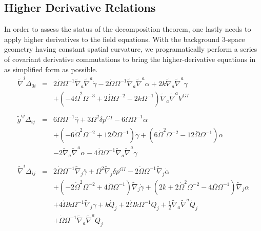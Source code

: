 \subsection{Higher Derivative Relations}
In order to assess the status of the decomposition theorem, one lastly needs to apply higher derivatives to the field equations. With the background 3-space geometry having constant spatial curvature, we programatically perform a series of covariant derivative commutations to bring the higher-derivative equations in as simplified form as possible.
\begin{eqnarray}
\tilde\nabla^i\Delta_{0i}&=& 2 \dot{\Omega} \Omega^{-1} \tilde{\nabla}_{a}\tilde{\nabla}^{a}\dot{\gamma} - 2 \dot{\Omega} \Omega^{-1} \tilde{\nabla}_{a}\tilde{\nabla}^{a}\alpha + 2 k \tilde{\nabla}_{a}\tilde{\nabla}^{a}\gamma 
\nonumber\\
&&+(-4 \dot{\Omega}^2 \Omega^{-3} + 2 \overset{..}{\Omega} \Omega^{-2} - 2 k \Omega^{-1}) \tilde{\nabla}_{a}\tilde{\nabla}^{a}V^{GI}{}
\\  \nonumber\\ 
\tilde g^{ij}\Delta_{ij}&=& 6 \dot{\Omega} \Omega^{-1} \overset{..}{\gamma} + 3 \Omega^2 \delta p^{GI}{} - 6 \dot{\Omega} \Omega^{-1} \dot{\alpha} 
\nonumber\\
&&+ (-6 \dot{\Omega}^2 \Omega^{-2} + 12 \overset{..}{\Omega} \Omega^{-1}) \dot{\gamma} + (6 \dot{\Omega}^2 \Omega^{-2} - 12 \overset{..}{\Omega} \Omega^{-1}) \alpha \nonumber \\ 
&& - 2 \tilde{\nabla}_{a}\tilde{\nabla}^{a}\alpha - 4 \dot{\Omega} \Omega^{-1} \tilde{\nabla}_{a}\tilde{\nabla}^{a}\gamma 
\\  \nonumber\\ 
\tilde\nabla^i\Delta_{ij}&=& 2 \dot{\Omega} \Omega^{-1} \tilde{\nabla}_{j}\overset{..}{\gamma} + \Omega^2 \tilde{\nabla}_{j}\delta p^{GI}{} - 2 \dot{\Omega} \Omega^{-1} \tilde{\nabla}_{j}\dot{\alpha} 
\nonumber\\
&&+ (-2 \dot{\Omega}^2 \Omega^{-2} + 4 \overset{..}{\Omega} \Omega^{-1}) \tilde{\nabla}_{j}\dot{\gamma} + (2 k + 2 \dot{\Omega}^2 \Omega^{-2} - 4 \overset{..}{\Omega} \Omega^{-1}) \tilde{\nabla}_{j}\alpha 
\nonumber\\
&&+ 4 \dot{\Omega} k \Omega^{-1} \tilde{\nabla}_{j}\gamma +k \dot{Q}_{j} + 2 \dot{\Omega} k \Omega^{-1} Q_{j} + \tfrac{1}{2} \tilde{\nabla}_{a}\tilde{\nabla}^{a}\dot{Q}_{j} \nonumber \\ 
&& + \dot{\Omega} \Omega^{-1} \tilde{\nabla}_{a}\tilde{\nabla}^{a}Q_{j}

\end{eqnarray}
